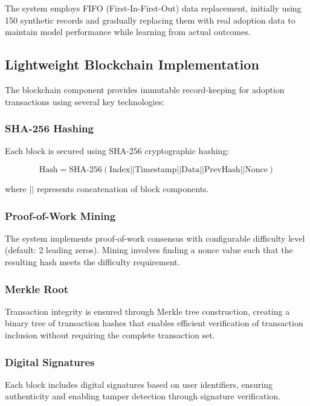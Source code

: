 \documentclass[conference]{IEEEtran}
\begin{document}
The system employs FIFO (First-In-First-Out) data replacement, initially using 150 synthetic records and gradually replacing them with real adoption data to maintain model performance while learning from actual outcomes.

\subsection{Lightweight Blockchain Implementation}

The blockchain component provides immutable record-keeping for adoption transactions using several key technologies:

\subsubsection{SHA-256 Hashing}
Each block is secured using SHA-256 cryptographic hashing:

\begin{equation}
\text{Hash} = \text{SHA-256}(\text{Index} || \text{Timestamp} || \text{Data} || \text{PrevHash} || \text{Nonce})
\end{equation}

where $||$ represents concatenation of block components.

\subsubsection{Proof-of-Work Mining}
The system implements proof-of-work consensus with configurable difficulty level (default: 2 leading zeros). Mining involves finding a nonce value such that the resulting hash meets the difficulty requirement.

\subsubsection{Merkle Root}
Transaction integrity is ensured through Merkle tree construction, creating a binary tree of transaction hashes that enables efficient verification of transaction inclusion without requiring the complete transaction set.

\subsubsection{Digital Signatures}
Each block includes digital signatures based on user identifiers, ensuring authenticity and enabling tamper detection through signature verification.
\end{document}
